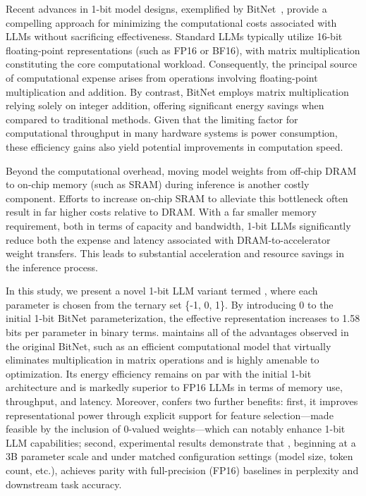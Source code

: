 Recent advances in 1-bit model designs, exemplified by BitNet~\cite{bitnet}, provide a compelling approach for minimizing the computational costs associated with LLMs without sacrificing effectiveness. Standard LLMs typically utilize 16-bit floating-point representations (such as FP16 or BF16), with matrix multiplication constituting the core computational workload. Consequently, the principal source of computational expense arises from operations involving floating-point multiplication and addition. By contrast, BitNet employs matrix multiplication relying solely on integer addition, offering significant energy savings when compared to traditional methods. Given that the limiting factor for computational throughput in many hardware systems is power consumption, these efficiency gains also yield potential improvements in computation speed.

Beyond the computational overhead, moving model weights from off-chip DRAM to on-chip memory (such as SRAM) during inference is another costly component. Efforts to increase on-chip SRAM to alleviate this bottleneck often result in far higher costs relative to DRAM. With a far smaller memory requirement, both in terms of capacity and bandwidth, 1-bit LLMs significantly reduce both the expense and latency associated with DRAM-to-accelerator weight transfers. This leads to substantial acceleration and resource savings in the inference process.

In this study, we present a novel 1-bit LLM variant termed \textbf{}, where each parameter is chosen from the ternary set \{-1, 0, 1\}. By introducing 0 to the initial 1-bit BitNet parameterization, the effective representation increases to 1.58 bits per parameter in binary terms.  maintains all of the advantages observed in the original BitNet, such as an efficient computational model that virtually eliminates multiplication in matrix operations and is highly amenable to optimization. Its energy efficiency remains on par with the initial 1-bit architecture and is markedly superior to FP16 LLMs in terms of memory use, throughput, and latency. Moreover,  confers two further benefits: first, it improves representational power through explicit support for feature selection—made feasible by the inclusion of 0-valued weights—which can notably enhance 1-bit LLM capabilities; second, experimental results demonstrate that , beginning at a 3B parameter scale and under matched configuration settings (model size, token count, etc.), achieves parity with full-precision (FP16) baselines in perplexity and downstream task accuracy.


